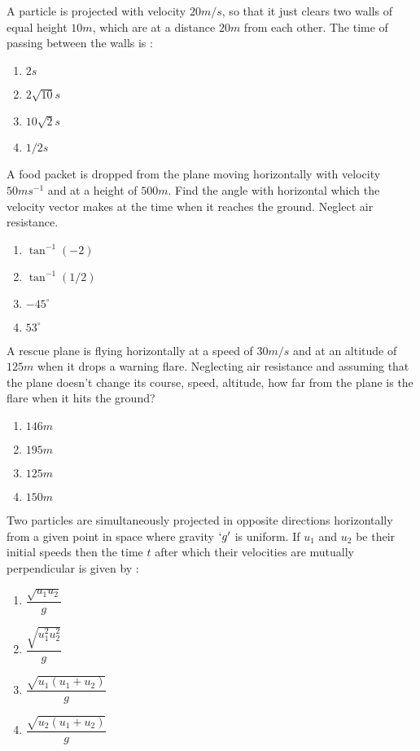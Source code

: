 \item A particle is projected with velocity $20 m/s$, so that it just clears two walls of equal height $10m$, which are at a distance $20 m$ from each other. The time of passing between the walls is :
\begin{multicols}{4}
\begin{enumerate}
\item $2 s$\ans
\item $2\sqrt{10} s$
\item $10\sqrt{2} s$
\item $1/2 s$
\end{enumerate} 
\end{multicols}


\item A food packet is dropped from the plane moving horizontally with velocity $50 m s^{-1}$ and at a height of $500m$. Find the angle with horizontal which the velocity vector makes at the time when it reaches the ground. Neglect air resistance.
\begin{multicols}{4}
\begin{enumerate}
\item $\tan^{-1}(-2)$\ans
\item $\tan^{-1}(1/2)$
\item $-45^\circ$
\item $53^\circ$
\end{enumerate} 
\end{multicols}


\item A rescue plane is flying horizontally at a speed of $30 m/s$ and at an altitude of $125 m $ when it drops a warning flare. Neglecting air resistance and assuming that the plane doesn't change its course, speed, altitude, how far from the plane is the flare when it hits the ground?
\begin{multicols}{4}
\begin{enumerate}
\item $146 m$
\item $195 m$
\item $125 m$
\item $150 m$\ans
\end{enumerate} 
\end{multicols}


\item Two particles are simultaneously projected in opposite directions horizontally from a given point in space where gravity $`g'$ is uniform. If $u_1$ and $u_2$ be their initial speeds then the time $t$ after which their velocities are mutually perpendicular is given by :
\begin{multicols}{4}
\begin{enumerate}
\item $\dfrac{\sqrt{u_1u_2}}{g}$\ans
\item $\dfrac{\sqrt{u_1^2u_2^2}}{g}$
\item $\dfrac{\sqrt{u_1(u_1 + u_2)}}{g}$
\item $\dfrac{\sqrt{u_2(u_1 + u_2)}}{g}$
\end{enumerate} 
\end{multicols}


